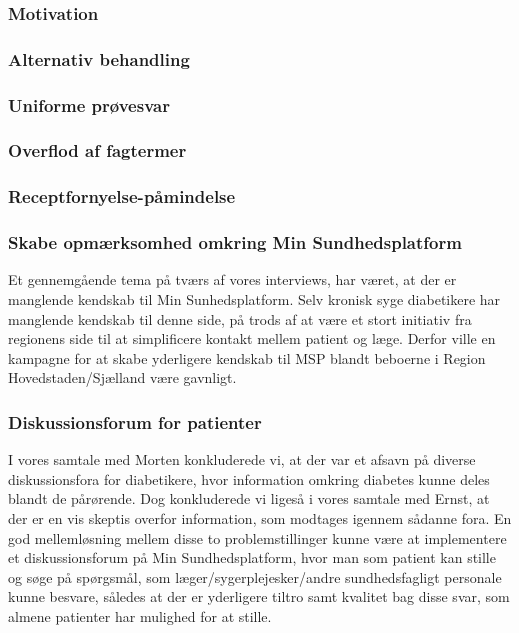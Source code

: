 \subsubsection{Motivation}

\subsubsection{Alternativ behandling}
\subsubsection{Uniforme prøvesvar}

\subsubsection{Overflod af fagtermer}

\subsubsection{Receptfornyelse-påmindelse}

\subsubsection{Skabe opmærksomhed omkring Min Sundhedsplatform}
Et gennemgående tema på tværs af vores interviews, har været, at der er manglende kendskab til Min Sunhedsplatform. Selv kronisk syge diabetikere har manglende kendskab til denne side, på trods af at være et stort initiativ fra regionens side til at simplificere kontakt mellem patient og læge. Derfor ville en kampagne for at skabe yderligere kendskab til MSP blandt beboerne i Region Hovedstaden/Sjælland være gavnligt.

\subsubsection{Diskussionsforum for patienter}
I vores samtale med Morten konkluderede vi, at der var et afsavn på diverse diskussionsfora for diabetikere, hvor information omkring diabetes kunne deles blandt de pårørende.
Dog konkluderede vi ligeså i vores samtale med Ernst, at der er en vis skeptis overfor information, som modtages igennem sådanne fora. En god mellemløsning mellem disse to problemstillinger kunne være at implementere et diskussionsforum på Min Sundhedsplatform, hvor man som patient kan stille og søge på spørgsmål, som læger/sygerplejesker/andre sundhedsfagligt personale kunne besvare, således at der er yderligere tiltro samt kvalitet bag disse svar, som almene patienter har mulighed for at stille. 

